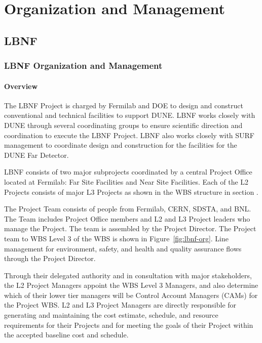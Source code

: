 
\chapter{Organization and Management}
\label{v1ch:org-mgmt}

\section{LBNF}
\subsection{LBNF Organization and Management}

\subsubsection{Overview}

The LBNF Project is charged by Fermilab and DOE to design and construct conventional and technical facilities to support DUNE. LBNF works closely with DUNE through several coordinating groups to ensure scientific direction and coordination to execute the LBNF Project. LBNF also works closely with SURF management to coordinate design and construction for the facilities for the DUNE Far Detector. 

LBNF consists of two major subprojects coordinated by a central Project Office located at Fermilab: Far Site Facilities and Near Site Facilities. Each of the L2 Projects consists of major L3 Projects as shown in the WBS structure in section .

The Project Team consists of people from Fermilab, CERN, SDSTA, and BNL. The Team includes Project Office members and L2 and L3 Project leaders who manage the Project. The team is assembled by the Project Director. The Project team to WBS Level 3 of the WBS is shown in Figure~\ref{fig:lbnf-org}.  Line management for environment, safety, and health and quality assurance flows through the Project Director. 

Through their delegated authority and in consultation with major stakeholders, the L2 Project Managers appoint the WBS Level 3 Managers, and also determine which of their lower tier managers will be Control Account Managers (CAMs) for the Project WBS. L2 and L3 Project Managers are directly responsible for generating and maintaining the cost estimate, schedule, and resource requirements for their Projects and for meeting the goals of their Project within the accepted baseline cost and schedule. 

